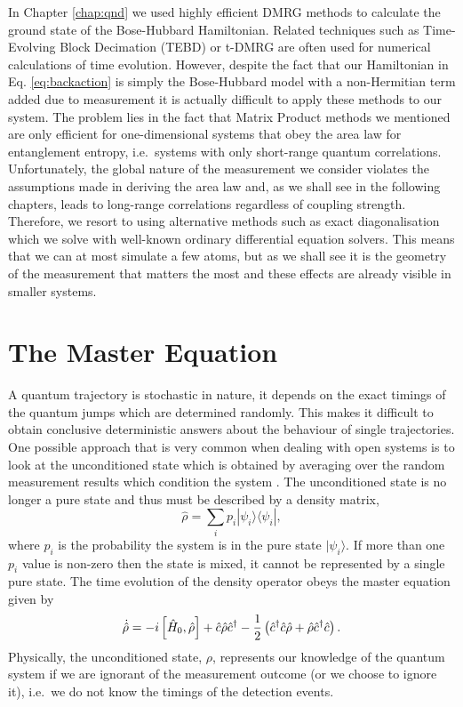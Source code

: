 In Chapter \ref{chap:qnd} we used highly efficient DMRG methods
\cite{tnt} to calculate the ground state of the Bose-Hubbard
Hamiltonian. Related techniques such as Time-Evolving Block Decimation
(TEBD) or t-DMRG are often used for numerical calculations of time
evolution. However, despite the fact that our Hamiltonian in
Eq. \eqref{eq:backaction} is simply the Bose-Hubbard model with a
non-Hermitian term added due to measurement it is actually difficult
to apply these methods to our system. The problem lies in the fact
that Matrix Product methods we mentioned are only efficient for
one-dimensional systems that obey the area law for entanglement
entropy, i.e.~systems with only short-range quantum
correlations. Unfortunately, the global nature of the measurement we
consider violates the assumptions made in deriving the area law and,
as we shall see in the following chapters, leads to long-range
correlations regardless of coupling strength. Therefore, we resort to
using alternative methods such as exact diagonalisation which we solve
with well-known ordinary differential equation solvers. This means
that we can at most simulate a few atoms, but as we shall see it is
the geometry of the measurement that matters the most and these
effects are already visible in smaller systems.

\section{The Master Equation}
\label{sec:master}

A quantum trajectory is stochastic in nature, it depends on the exact
timings of the quantum jumps which are determined randomly. This makes
it difficult to obtain conclusive deterministic answers about the
behaviour of single trajectories. One possible approach that is very
common when dealing with open systems is to look at the unconditioned
state which is obtained by averaging over the random measurement
results which condition the system \cite{MeasurementControl}. The
unconditioned state is no longer a pure state and thus must be
described by a density matrix,
\begin{equation}
  \label{eq:rho}
  \hat{\rho} = \sum_i p_i | \psi_i \rangle \langle \psi_i |,
\end{equation}
where $p_i$ is the probability the system is in the pure state
$| \psi_i \rangle$. If more than one $p_i$ value is non-zero then the
state is mixed, it cannot be represented by a single pure state. The
time evolution of the density operator obeys the master equation given
by
\begin{equation}
  \dot{\hat{\rho}} = -i \left[ \hat{H}_0, \hat{\rho} \right] + \hat{c}
  \hat{\rho} \hat{c}^\dagger - \frac{1}{2} \left( \hat{c}^\dagger \hat{c} \hat{\rho} + \hat{\rho}
    \hat{c}^\dagger \hat{c} \right).
\end{equation}
Physically, the unconditioned state, $\rho$, represents our knowledge
of the quantum system if we are ignorant of the measurement outcome
(or we choose to ignore it), i.e.~we do not know the timings of the
detection events. 

